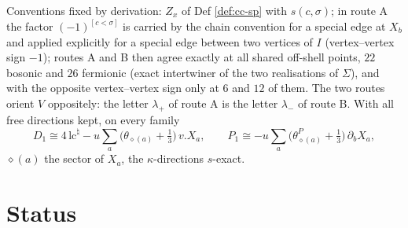 \documentclass[11pt]{article}
\numberwithin{equation}{section}
\theoremstyle{plain}
\theoremstyle{definition}
\begin{document}
Conventions fixed by derivation: $Z_x$ of Def \ref{def:cc-sp} with $s(c,\sigma)$; in route A the factor $(-1)^{[c<\sigma]}$ is carried by the chain convention for a special edge at $X_b$ and applied explicitly for a special edge between two vertices of $I$ (vertex--vertex sign $-1$); routes A and B then agree exactly at all shared off-shell points, $22$ bosonic and $26$ fermionic (exact intertwiner of the two realisations of $\Sigma$), and with the opposite vertex--vertex sign only at $6$ and $12$ of them. The two routes orient $V$ oppositely: the letter $\lambda_+$ of route A is the letter $\lambda_-$ of route B. With all free directions kept, on every family
\[
D_1\cong4\,\mathrm{lc}^\natural-u\sum_a\big(\theta_{\diamond(a)}+\tfrac13\big)\,v.X_a,\qquad P_1\cong-u\sum_a\big(\theta^P_{\diamond(a)}+\tfrac13\big)\,\partial_bX_a,
\]
$\diamond(a)$ the sector of $X_a$, the $\kappa$-directions $s$-exact.

\section{Status}
\label{sec:cc-status}
\end{document}
